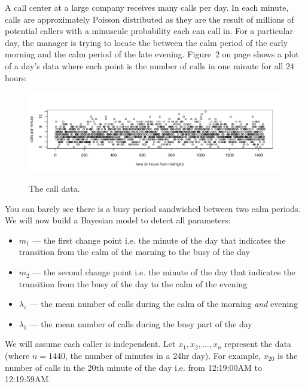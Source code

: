 \documentclass[12pt]{article}
\begin{document}
\problem A call center at a large company receives many calls per day. In each minute, calls are approximately Poisson distributed as they are the result of millions of potential callers with a minuscule probability each can call in. For a particular day, the manager is trying to locate the  between the calm period of the early morning and the calm period of the late evening. Figure~2 on page \pageref{fig:call_data} shows a plot of a day's data where each point is the number of calls in one minute for all 24 hours:

\begin{figure}[h]
\centering
\includegraphics[width=6in]{call_data}
\label{fig:call_data}
\caption{The call data.}
\end{figure}

You can barely see there is a busy period sandwiched between two calm periods. We will now build a Bayesian model to detect all parameters:

\begin{itemize}
\item $m_1$ --- the first change point i.e. the minute of the day that indicates the transition from the calm of the morning to the busy of the day
\item $m_2$ --- the second change point i.e. the minute of the day that indicates the transition from the busy of the day to the calm of the evening
\item $\lambda_c$ --- the mean number of calls during the calm of the morning \textit{and} evening
\item $\lambda_b$ --- the mean number of calls during the busy part of the day
\end{itemize}

We will assume each caller is independent. Let $x_1, x_2, \ldots, x_{n}$ represent the data (where $n=1440$, the number of minutes in a 24hr day). For example, $x_{20}$ is the number of calls in the 20th minute of the day i.e. from 12:19:00AM to 12:19:59AM.



\benum
\end{document}
